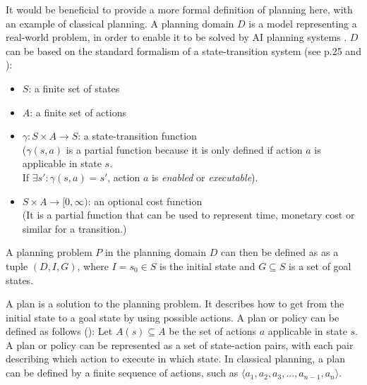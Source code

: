 \documentclass{article}
\begin{document}
It would be beneficial to provide a more formal definition of planning here, with an example of classical planning. A planning domain $D$ is a model representing a real-world problem, in order to enable it to be solved by AI planning systems \cite{ghallab_nau_traverso_2016}. $D$ can be based on the standard formalism of a state-transition system (see \cite{ghallab_nau_traverso_2016} p.25 and \cite{CIMATTI200335}):
\begin{itemize}%
	\item $S$: a finite set of states
	\item $A$: a finite set of actions
	\item $\gamma : S\times A \rightarrow S$: a state-transition function\\ ($\gamma(s,a)$ is  a partial function because it is only defined if action $a$ is applicable in state $s$.\\ If $\exists s': \gamma(s,a)=s'$, action $a$ is \textit{enabled} or \textit{executable}).
	\item $S\times A \rightarrow [0,\infty)$: an optional cost function\\ (It is a partial function that can be used to represent time, monetary cost or similar for a transition.)
\end{itemize}

A planning problem $P$ in the planning domain $D$ can then be defined as as a tuple $(D,I,G)$, where $I = {s_0} \in S$ is the initial state and $G \subseteq S$ is a set of goal states.

A plan is a solution to the planning problem. It describes how to get from the initial state to a goal state by using possible actions. A plan or policy can be defined as follows (\cite{KuterNau-HTNSMC}):
Let $A(s) \subseteq A$ be the set of actions $a$ applicable in state $s$. 
A plan or policy can be represented as a set of state-action pairs, with each pair describing which action to execute in which state. %
In classical planning, a plan can be defined by a finite sequence of actions, such as $\langle a_1 ,a_2, a_3, ... , a_{n-1}, a_n \rangle$. 

\end{document}
